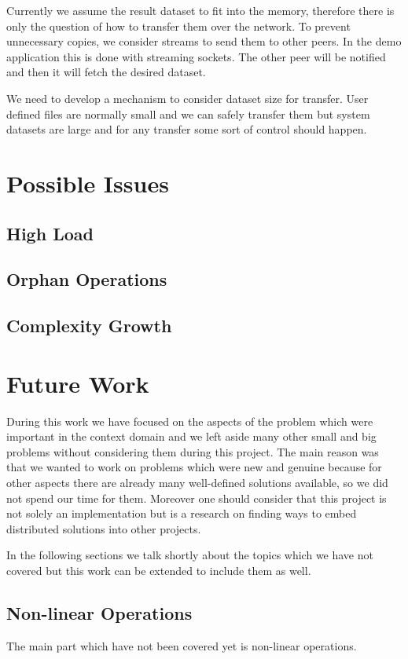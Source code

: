Currently we assume the result dataset to fit into the memory, 
therefore there is only the question of how to transfer them over the network. 
To prevent unnecessary copies, we consider streams to send them to other peers. 
In the demo application this is done with streaming sockets. 
The other peer will be notified and then it will fetch the desired dataset.

We need to develop a mechanism to consider dataset size for transfer. 
User defined files are normally small and we can safely transfer them but
system datasets are large and for any transfer some sort of control should happen.

\section{Possible Issues}
\subsection{High Load}
\subsection{Orphan Operations}
\subsection{Complexity Growth}

\section{Future Work}
During this work we have focused on the aspects of the problem which were important in the context 
domain and we left aside many other small and big problems without considering them during this project. The main
reason was that we wanted to work on problems which were new and genuine
because for other aspects there are already many well-defined solutions
available, so we did not spend our time for them. Moreover one should 
consider that this project is not solely an implementation but is a 
research on finding ways to embed distributed solutions into other projects.

In the following sections we talk shortly about the topics which we have
not covered but this work can be extended to include them as well.

\subsection{Non-linear Operations}
The main part which have not been covered yet is non-linear operations.


